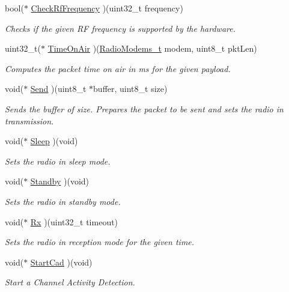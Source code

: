 \begin{DoxyCompactItemize}
bool($\ast$ \hyperlink{group__LORA_gad26df1cecc02c5d50f07ff062962f501}{Check\+Rf\+Frequency} )(uint32\+\_\+t frequency)
\begin{DoxyCompactList}\small\item\em Checks if the given RF frequency is supported by the hardware. \end{DoxyCompactList}\item 
uint32\+\_\+t($\ast$ \hyperlink{group__LORA_ga36552db411e04e05c7962912854d48ae}{Time\+On\+Air} )(\hyperlink{group__LORA_ga992ef7a5b7f52975ba7bd8dd97740057}{Radio\+Modems\+\_\+t} modem, uint8\+\_\+t pkt\+Len)
\begin{DoxyCompactList}\small\item\em Computes the packet time on air in ms for the given payload. \end{DoxyCompactList}\item 
void($\ast$ \hyperlink{group__LORA_ga80f05bcd6ec2aea2eec2fc16850c6829}{Send} )(uint8\+\_\+t $\ast$buffer, uint8\+\_\+t size)
\begin{DoxyCompactList}\small\item\em Sends the buffer of size. Prepares the packet to be sent and sets the radio in transmission. \end{DoxyCompactList}\item 
void($\ast$ \hyperlink{group__LORA_ga1ce3ea830b03dffac6f6fec459dc77d3}{Sleep} )(void)
\begin{DoxyCompactList}\small\item\em Sets the radio in sleep mode. \end{DoxyCompactList}\item 
void($\ast$ \hyperlink{group__LORA_ga2972c07018c9c2de5c76c6c0563bea7b}{Standby} )(void)
\begin{DoxyCompactList}\small\item\em Sets the radio in standby mode. \end{DoxyCompactList}\item 
void($\ast$ \hyperlink{group__LORA_ga102f21c524b5c8eb87a2d65f8ac6cbe4}{Rx} )(uint32\+\_\+t timeout)
\begin{DoxyCompactList}\small\item\em Sets the radio in reception mode for the given time. \end{DoxyCompactList}\item 
void($\ast$ \hyperlink{group__LORA_ga8f9e97d8a3010e96e108dc62c1e5b107}{Start\+Cad} )(void)
\begin{DoxyCompactList}\small\item\em Start a Channel Activity Detection. \end{DoxyCompactList}\item 

\end{DoxyCompactItemize}
